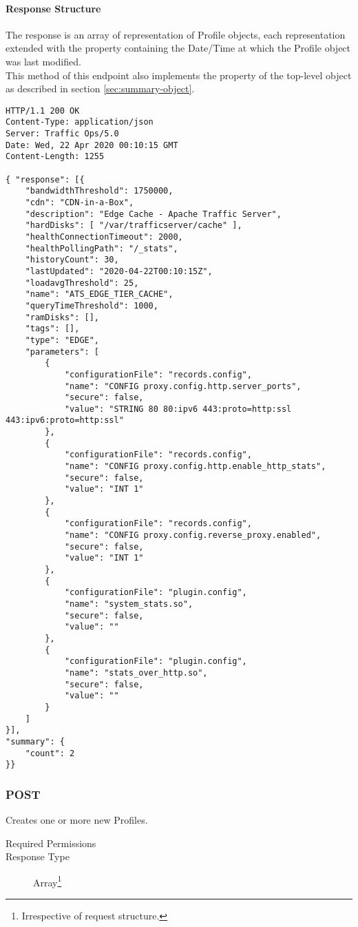 \paragraph{Response Structure}
The response is an array of representation of Profile objects, each
representation extended with the  property containing the
Date/Time at which the Profile object was last modified.\\
This method of this endpoint also implements the  property of the
top-level  object as described in section
\ref{sec:summary-object}.\\

\begin{codelisting}
\begin{verbatim}
HTTP/1.1 200 OK
Content-Type: application/json
Server: Traffic Ops/5.0
Date: Wed, 22 Apr 2020 00:10:15 GMT
Content-Length: 1255

{ "response": [{
	"bandwidthThreshold": 1750000,
	"cdn": "CDN-in-a-Box",
	"description": "Edge Cache - Apache Traffic Server",
	"hardDisks": [ "/var/trafficserver/cache" ],
	"healthConnectionTimeout": 2000,
	"healthPollingPath": "/_stats",
	"historyCount": 30,
	"lastUpdated": "2020-04-22T00:10:15Z",
	"loadavgThreshold": 25,
	"name": "ATS_EDGE_TIER_CACHE",
	"queryTimeThreshold": 1000,
	"ramDisks": [],
	"tags": [],
	"type": "EDGE",
	"parameters": [
		{
			"configurationFile": "records.config",
			"name": "CONFIG proxy.config.http.server_ports",
			"secure": false,
			"value": "STRING 80 80:ipv6 443:proto=http:ssl 443:ipv6:proto=http:ssl"
		},
		{
			"configurationFile": "records.config",
			"name": "CONFIG proxy.config.http.enable_http_stats",
			"secure": false,
			"value": "INT 1"
		},
		{
			"configurationFile": "records.config",
			"name": "CONFIG proxy.config.reverse_proxy.enabled",
			"secure": false,
			"value": "INT 1"
		},
		{
			"configurationFile": "plugin.config",
			"name": "system_stats.so",
			"secure": false,
			"value": ""
		},
		{
			"configurationFile": "plugin.config",
			"name": "stats_over_http.so",
			"secure": false,
			"value": ""
		}
	]
}],
"summary": {
	"count": 2
}}
\end{verbatim}
\end{codelisting}

\subsubsection{POST}
Creates one or more new Profiles.
\begin{description}
	\item[Required Permissions] 
	\item[Response Type] Array\footnote{Irrespective of request structure.}
\end{description}

